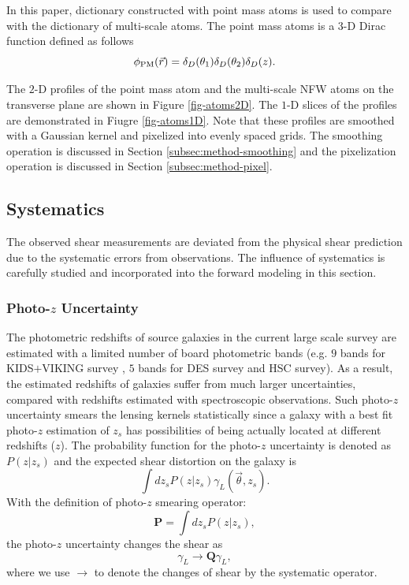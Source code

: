 \documentclass[twocolumn]{aastex62}
\begin{document}
In this paper, dictionary constructed with point mass atoms is used to compare with the dictionary of multi-scale atoms.
The point mass atoms is a $3$-D Dirac function defined as follows
\begin{equation}
\phi_{\rm{PM}}(\vec{r})= \delta_D(\theta_1) \delta_D(\theta_2) \delta_D(z).
\end{equation}

The $2$-D profiles of the point mass atom and the multi-scale NFW atoms on the transverse plane are shown in Figure
\ref{fig-atoms2D}. The $1$-D slices of the profiles are demonstrated in Fiugre \ref{fig-atoms1D}. Note that these profiles
are smoothed with a Gaussian kernel and pixelized into evenly spaced grids. The smoothing operation is discussed in
Section \ref{subsec:method-smoothing} and the pixelization operation is discussed in Section \ref{subsec:method-pixel}.

\subsection{Systematics}
\label{subsec:method-Systematics}

The observed shear measurements are deviated from the physical shear prediction due to the systematic
errors from observations. The influence of systematics is carefully studied and incorporated into the forward
modeling in this section.

\subsubsection{Photo-$z$ Uncertainty}
\label{subsec:method-photoz}

The photometric redshifts of source galaxies in the current large scale survey are estimated with a limited number of
board photometric bands (e.g. $9$ bands for KIDS$+$VIKING survey \citep{KIDS_VIKING-Hildebrant2020}, $5$ bands for DES
survey and HSC survey). As a result, the estimated redshifts of galaxies suffer from much larger uncertainties, compared
with redshifts estimated with spectroscopic observations. Such photo-$z$ uncertainty smears the lensing kernels statistically
since a galaxy with a best fit photo-$z$ estimation of $z_s$ has possibilities of being actually located at different
redshifts ($z$). The probability function for the photo-$z$ uncertainty is denoted as $P(z|z_s)$ and the expected shear
distortion on the galaxy is
\begin{equation}\label{eq-delta2gamma-poz}
\int dz_s P(z|z_s) \gamma_L(\vec{\theta},z_s).
\end{equation}
With the definition of photo-$z$ smearing operator:
\begin{equation}
\mathbf{P} = \int dz_s P(z|z_s),
\end{equation}
the photo-$z$ uncertainty changes the shear as
\begin{equation}
\gamma_L \rightarrow \mathbf{Q} \gamma_L,
\end{equation}
where we use $\rightarrow$ to denote the changes of shear by the systematic operator.
\end{document}

